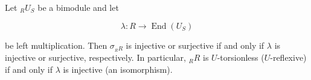 Let ${}_R U_S$ be a bimodule and let

$$\lambda: R \to \operatorname{End}(U_S)$$

be left multiplication. Then $\sigma_{{}_R R}$ is injective or surjective if and only if $\lambda$ is injective or surjective, respectively. In particular, ${}_R R$ is $U$-torsionless ($U$-reflexive) if and only if $\lambda$ is injective (an isomorphism).
